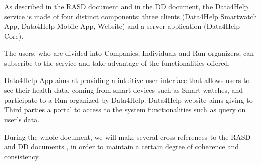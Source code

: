 As described in the RASD document and in the DD document, the Data4Help service is made of four distinct components: three clients (Data4Help Smartwatch App, Data4Help Mobile App, Website) and a server application (Data4Help Core).

The users, who are divided into Companies, Individuals and Run organizers, can subscribe to the service and take advantage of the functionalities offered.

Data4Help App aims at providing a intuitive user interface that allows users to see their health data, coming from smart devices such as Smart-watches, and participate to a Run organized by Data4Help. Data4Help website aims giving to Third parties a portal to access to the system functionalities such as query on user's data. 

During the whole document, we will make several cross-references to the RASD and DD documents , in order to maintain a certain degree of coherence and consistency.

